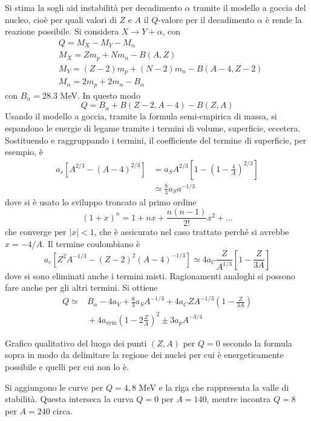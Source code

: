 \documentclass[11pt, a4paper]{scrartcl}
\theoremstyle{style}
\newenvironment{boxenv}[1][]{
    \begin{eqbox}[#1]
    }{
   \end{eqbox}
}
\numberwithin{equation}{subsection}
\begin{document}
Si stima la sogli aid instabilit\`a per decadimento $\alpha $ tramite il modello a goccia del nucleo, cio\`e per quali valori di $Z$ e $A$ il $Q$-valore per il decadimento $\alpha $ \`e rende la reazione possibile.
Si considera $X \to  Y + \alpha $, con 
\[
\begin{split}
	&Q = M_X - M_Y - M_\alpha \\
	& M_X = Zm_p + N m_n - B(A,Z)\\
	& M_Y = (Z-2)m_p + (N-2) m_n - B(A-4,Z-2)\\
	& M_\alpha  = 2m_p + 2m_n - B_\alpha 
\end{split}
\] 
con $B_\alpha  = 28.3$ MeV.
In questo modo
\[
Q = B_\alpha  + B(Z-2,A-4) - B(Z,A)
\] 
Usando il modello a goccia, tramite la formula semi-empirica di massa, si espandono le energie di legame tramite i termini di volume, superficie, eccetera.
Sostituendo e raggruppando i termini, il coefficiente del termine di superficie, per esempio, \`e
\[
	\begin{split}
		a_s \left[ A^{2 /3 } - (A-4)^{2/3} \right] &= a_S A^{2 / 3} \left[ 1 - \left(1 - \frac{4}{A}\right) ^{2 / 3} \right] \\
							   &\simeq \frac{8}{3} a_S a ^{- 1/3}
	\end{split}
\] 
dove si \`e usato lo sviluppo troncato al primo ordine
\[
	(1+x)^n = 1+ nx + \frac{n (n-1)}{2!}x^2 + \ldots
\] 
che converge per $\lvert x \rvert <1$, che \`e assicurato nel caso trattato perch\'e si avrebbe $x = - 4 / A$.
Il termine coulombiano \`e 
\[
a_c \left[ Z^2 A^{- 1 / 3} - (Z-2)^2 (A-4)^{ -1  /3} \right] \simeq 4 a_C \frac{Z}{A^{1 / 3}} \left[ 1 - \frac{Z}{3A} \right] 
\] 
dove si sono eliminati anche i termini misti.
Ragionamenti analoghi si possono fare anche per gli altri termini.
Si ottiene
\begin{equation}
	\begin{split}
		Q \simeq{ } & B_\alpha  - 4 a_V + \frac{8}{3} a_S A^{- 1 / 3} + 4 a_C Z A^{-1 / 3} \left(1 - \frac{Z}{3A}\right) \\
			    & { } + 4 a_\text{sym} \left(1 - 2 \frac{Z}{A}\right) ^2 \pm 3 a_p A^{- 3 / 4}
	\end{split}
\end{equation}
\begin{boxenv}[]
Grafico qualitativo del luogo dei punti $(Z,A)$ per $Q=0$ secondo la formula sopra in modo da delimitare la regione dei nuclei per cui \`e energeticamente possibile e quelli per cui non lo \`e.

Si aggiungono le curve per $Q = 4,8$ MeV e la riga che rappresenta la valle di stabilit\`a.
Questa interseca la curva $Q = 0$ per $A = 140$, mentre incontra $Q=8$ per $A = 240$ circa.
\end{boxenv}
\end{document}
